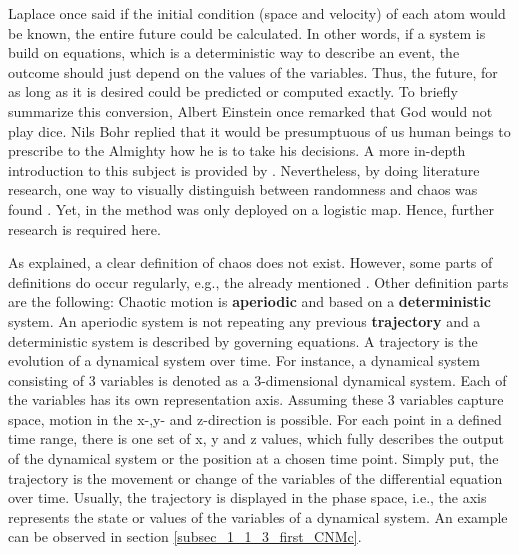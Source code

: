 Laplace once said if the initial condition
(space and velocity) of each atom would be known,  
the entire future 
could be calculated. In other words, if a system is 
build on equations, which is a deterministic way 
to describe an event, the outcome should just 
depend on the values of the variables. 
Thus, the future, for as long as it is desired could be predicted 
or computed exactly. To briefly summarize this conversion, 
Albert Einstein once remarked that God would not play dice. Nils 
Bohr replied that it 
would be presumptuous of us human beings to prescribe to the Almighty 
how he is to take his decisions. A more in-depth introduction to 
this subject is provided by \cite{Argyris2017}. 
Nevertheless, by doing literature research, one way to 
visually distinguish between
randomness and chaos was found \cite{Boeing2016}. 
Yet, in \cite{Boeing2016} the method was only 
deployed on a logistic map. Hence, further research 
is required here. \newline

As explained, a clear definition of chaos does not exist. 
However, some parts of definitions do occur regularly, e.g., 
the already mentioned . Other definition parts are the following: Chaotic 
motion is \textbf{aperiodic} and based on a \textbf{deterministic} system.
An aperiodic system is not repeating any 
previous \textbf{trajectory} and a deterministic system is 
described by governing equations. A trajectory is the evolution 
of a dynamical system over time. For instance, a dynamical system 
consisting of 3 variables is denoted as a 3-dimensional dynamical system.
Each of the variables has its own representation axis.
Assuming these 
3 variables capture space, motion in the x-,y- and z-direction 
is possible. For each point in a defined time range, there is one set of x, y and z values, which fully describes the output of the dynamical system or the position at a chosen time point. 
Simply put, the trajectory is the movement 
or change of the variables of the differential equation over time. Usually, the 
trajectory is displayed in the phase space, i.e., the axis represents the state or values of the variables of a dynamical system. An example can be observed in section \ref{subsec_1_1_3_first_CNMc}. \newline


